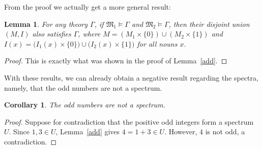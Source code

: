 \documentclass[12pt, reqno]{amsart}
\newtheorem{lemma}[theorem]{Lemma}
\newtheorem{corollary}[theorem]{Corollary}
\theoremstyle{definition}
\theoremstyle{remark}
\numberwithin{equation}{section}
\begin{document}
From the proof we actually get a more general result: 
\begin{lemma}
For any theory $\Gamma$, if $\mathfrak{M}_1 \models \Gamma$ and $\mathfrak{M}_2 \models \Gamma$, then their disjoint union $(M, I)$ also satisfies $\Gamma$, where $M = (M_1\times\{0\})\cup(M_2\times\{1\})$ and $I(x) = \bigl(I_1(x)\times\{0\}\bigr)
\cup
\bigl(I_2(x)\times\{1\}\bigr)$ for all nouns $x$.
\end{lemma}

\begin{proof}
This is exactly what was shown in the proof of Lemma~\ref{add}.
\end{proof}

With these results, we can already obtain a negative result regarding the spectra, namely, that the odd numbers are not a spectrum. 

\begin{corollary}
	The odd numbers are not a spectrum. 
\end{corollary}

\begin{proof}
	Suppose for contradiction that the positive odd integers form a spectrum $U$. Since $1,3\in U$, Lemma~\ref{add} gives $4=1+3\in U.$ However, $4$ is not odd, a contradiction.
\end{proof}
\end{document}
